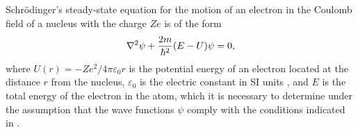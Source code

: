 \subsection{}\label{39.1.7} Schr\"odinger's steady-state equation  for the motion of an electron in the Coulomb field of a nucleus with the charge $Ze$  is of the form 
\begin{equation*}%
\laplacian \psi + \frac{2m}{\hbar^{2}} (E - U) \psi = 0,
\end{equation*}
where $U (r) = -Ze^{2}/4\pi \varepsilon_{0} r$ is the potential energy of an electron located at the distance $r$ from the nucleus, $\varepsilon_{0}$ is the electric constant in SI units , and $E$ is the total energy of the electron in the atom, which it is necessary to determine under the assumption that the wave functions $\psi$ comply with the conditions indicated in .

